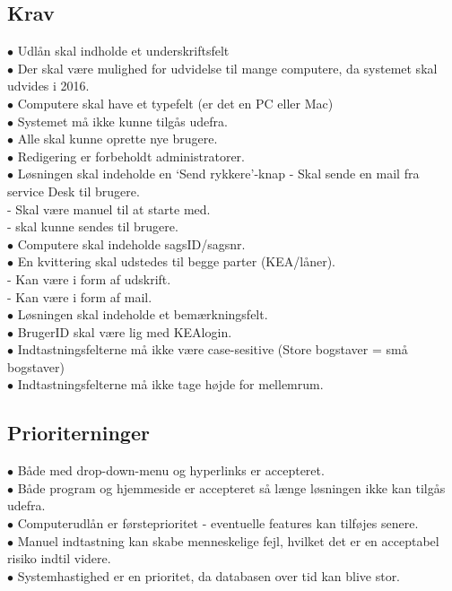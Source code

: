 \documentclass[a4paper]{article}
\begin{document}
\subsection*{Krav}
$\bullet$ Udlån skal indholde et underskriftsfelt \\
$\bullet$ Der skal være mulighed for udvidelse til mange computere, da systemet skal udvides i 2016. \\
$\bullet$ Computere skal have et typefelt (er det en PC eller Mac) \\
$\bullet$ Systemet må ikke kunne tilgås udefra. \\
$\bullet$ Alle skal kunne oprette nye brugere. \\
$\bullet$ Redigering er forbeholdt administratorer. \\
$\bullet$ Løsningen skal indeholde en ‘Send rykkere’-knap - Skal sende en mail fra service Desk til brugere. \\
\indent - Skal være manuel til at starte med. \\
\indent - skal kunne sendes til brugere. \\
$\bullet$ Computere skal indeholde sagsID/sagsnr. \\
$\bullet$ En kvittering skal udstedes til begge parter (KEA/låner).\\
\indent - Kan være i form af udskrift. \\
\indent - Kan være i form af mail. \\
$\bullet$ Løsningen skal indeholde et bemærkningsfelt. \\
$\bullet$ BrugerID skal være lig med KEAlogin. \\
$\bullet$ Indtastningsfelterne må ikke være case-sesitive (Store bogstaver = små bogstaver)\\
$\bullet$ Indtastningsfelterne må ikke tage højde for mellemrum.
\subsection*{Prioriterninger}
$\bullet$ Både med drop-down-menu og hyperlinks er accepteret. \\
$\bullet$ Både program og hjemmeside er accepteret så længe løsningen ikke kan tilgås udefra. \\
$\bullet$ Computerudlån er førsteprioritet - eventuelle features kan tilføjes senere. \\
$\bullet$ Manuel indtastning kan skabe menneskelige fejl, hvilket det er en acceptabel risiko indtil videre. \\
$\bullet$ Systemhastighed er en prioritet, da databasen over tid kan blive stor.
\end{document}
